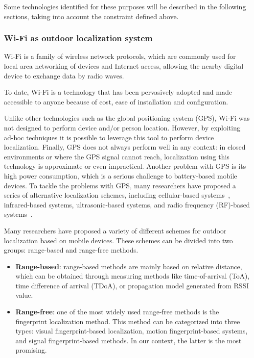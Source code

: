 Some technologies identified for these purposes will be described in the following sections, taking into account the constraint defined above.

\subsubsection{Wi-Fi as outdoor localization system}\label{subsec:wi-fi-as-outdoor-localization-system}

Wi-Fi is a family of wireless network protocols, which are commonly used for local area networking of devices and Internet access, allowing the nearby digital device to exchange data by radio waves.

To date, Wi-Fi is a technology that has been pervasively adopted and made accessible to anyone because of cost, ease of installation and configuration.

Unlike other technologies such as the global positioning system (GPS), Wi-Fi was not designed to perform device and/or person location.
However, by exploiting ad-hoc techniques it is possible to leverage this tool to perform device localization.
Finally, GPS does not always perform well in any context: in closed environments or where the GPS signal cannot reach, localization using
this technology is approximate or even impractical.
Another problem with GPS is its high power consumption, which is a serious challenge to battery-based mobile devices.
To tackle the problems with GPS, many researchers have proposed a series of alternative localization schemes, including cellular-based
systems~\cite{ibrahim2010cellsense}, infrared-based systems, ultrasonic-based systems, and radio frequency (RF)-based
systems~\cite{bahl2000radar, youssef2002probabilistic}.

Many researchers have proposed a variety of different schemes for outdoor localization based on mobile devices.
These schemes can be divided into two groups: range-based and range-free methods.

\begin{itemize}
	\item \textbf{Range-based}: range-based methods are mainly based on relative distance, which can be obtained through measuring methods like
	      time-of-arrival (ToA), time difference of arrival (TDoA), or propagation model generated from RSSI value.
	\item \textbf{Range-free}: one of the most widely used range-free methods is the fingerprint localization method.
	      This method can be categorized into three types:
	      visual fingerprint-based localization, motion fingerprint-based systems, and signal fingerprint-based methods.
	      In our context, the latter is the most promising.
\end{itemize}

